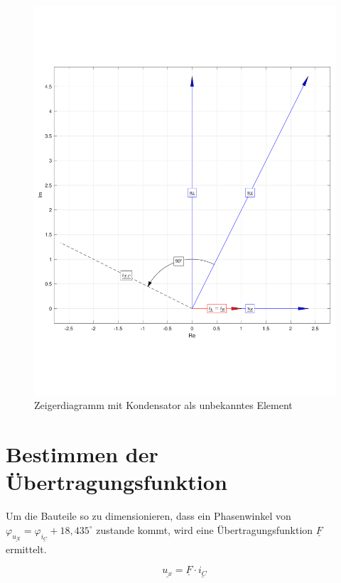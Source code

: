 \documentclass[11pt]{scrartcl}
\begin{document}
\begin{figure}[!htb]
    \begin{center}
      \includegraphics[width=0.90\linewidth]{./Assets/1_C.pdf}
    \caption{Zeigerdiagramm mit Kondensator als unbekanntes Element}
    \label{fig:diagramm-kond}
  \end{center}
\end{figure}



\newpage
\section{Bestimmen der Übertragungsfunktion}
\label{sec:best-der-ubertr}

Um die Bauteile so zu dimensionieren, dass ein Phasenwinkel von $\varphi_{\underline{u_{X}}} = \varphi_{\underline{i_{C}}} + 18,435^{\circ}$ zustande kommt, wird eine Übertragungsfunktion $\underline{F}$ ermittelt.

\begin{equation} \label{eq:uebertrag}
  \underline{u_{x}} = \underline{F} \cdot \underline{i_{C}}
\end{equation}
\end{document}
